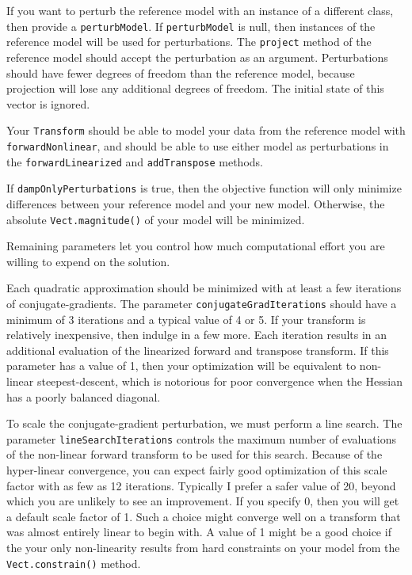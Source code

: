 \documentclass[12pt]{article}
\begin{document}
If you want to perturb the reference model
with an instance of a different class, then
provide a \texttt{perturbModel}.  If
\texttt{perturbModel} is null, then instances
of the reference model will be used for
perturbations.  The \texttt{project} method
of the reference model should accept the
perturbation as an argument.  Perturbations
should have fewer degrees of freedom than the
reference model, because projection will lose
any additional degrees of freedom.  The
initial state of this vector is ignored.

Your \texttt{Transform} should be able to
model your data from the reference model with
\texttt{forwardNonlinear}, and should be able
to use either model as perturbations in the
\texttt{forwardLinearized} and
\texttt{addTranspose} methods.

If \texttt{dampOnlyPerturbations} is true,
then the objective function will only
minimize differences between your reference
model and your new model.  Otherwise, the
absolute \texttt{Vect.magnitude()} of your
model will be minimized.

Remaining parameters let you control how much
computational effort you are willing to
expend on the solution.

Each quadratic approximation should be
minimized with at least a few iterations of
conjugate-gradients.  The parameter
\texttt{conjugateGradIterations} should have
a minimum of 3 iterations and a typical value
of 4 or 5.  If your transform is relatively
inexpensive, then indulge in a few more.
Each iteration results in an additional
evaluation of the linearized forward and
transpose transform.  If this parameter has a
value of 1, then your optimization will be
equivalent to non-linear steepest-descent,
which is notorious for poor convergence when
the Hessian has a poorly balanced diagonal.

To scale the conjugate-gradient perturbation,
we must perform a line search.  The parameter
\texttt{lineSearchIterations} controls the
maximum number of evaluations of the
non-linear forward transform to be used for
this search.  Because of the hyper-linear
convergence, you can expect fairly good
optimization of this scale factor with as few
as 12 iterations.  Typically I prefer a safer
value of 20, beyond which you are unlikely to
see an improvement.  If you specify 0, then
you will get a default scale factor of 1.
Such a choice might converge well on a
transform that was almost entirely linear to
begin with.  A value of 1 might be a good
choice if the your only non-linearity results
from hard constraints on your model from the
\texttt{Vect.constrain()} method.
\end{document}
